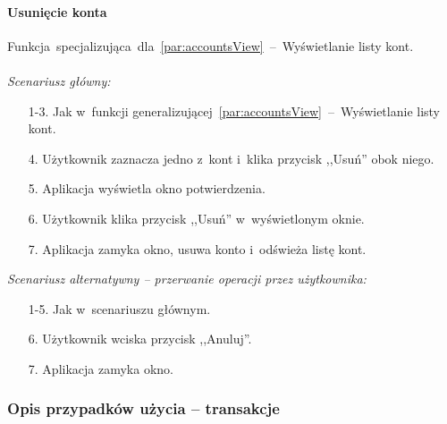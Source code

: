 \paragraph{Usunięcie konta\newline}
\label{par:accountDelete}
Funkcja~specjalizująca~dla~\ref{par:accountsView}~--~Wyświetlanie listy kont.\\\\
\textit{Scenariusz główny:}
\begin{enumerate}
  \item[1-3.] Jak w~funkcji generalizującej~\ref{par:accountsView}~--~Wyświetlanie listy kont.
  \item[4.] Użytkownik zaznacza jedno z~kont i~klika przycisk ,,Usuń'' obok niego.
  \item[5.] Aplikacja wyświetla okno potwierdzenia.
  \item[6.] Użytkownik klika przycisk ,,Usuń'' w~wyświetlonym oknie.
  \item[7.] Aplikacja zamyka okno, usuwa konto i~odświeża listę kont.
\end{enumerate}
\textit{Scenariusz alternatywny -- przerwanie operacji przez użytkownika:}
\begin{enumerate}
  \item[1-5.] Jak w~scenariuszu głównym.
  \item[6.] Użytkownik wciska przycisk ,,Anuluj''.
  \item[7.] Aplikacja zamyka okno.
\end{enumerate}

\subsubsection{Opis przypadków użycia -- transakcje}
\label{par:transactionsView}
